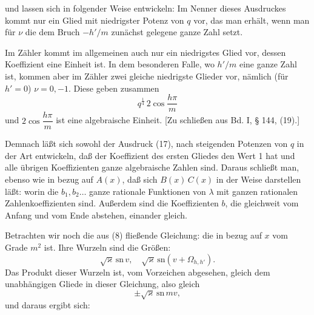 und lassen sich in folgender Weise entwickeln:
Im Nenner dieses Ausdruckes kommt nur ein Glied mit
niedrigster Potenz von $q$ vor, das man erhält, wenn man für $\nu$
die dem Bruch $-h'/m$ zunächst gelegene ganze Zahl setzt.

Im Zähler kommt im allgemeinen auch nur ein niedrigstes
Glied vor, dessen Koeffizient eine Einheit ist. In dem besonderen
Falle, wo $h'/m$ eine ganze Zahl ist, kommen aber im Zähler zwei
gleiche niedrigste Glieder vor, nämlich (für $h'=0$) $\nu=0,-1$.
Diese geben zusammen
\[
q^{\frac14}\,2\cos\frac{h\pi}{m}
\]
und $2\cos\dfrac{h\pi}{m}$ ist eine algebraische Einheit. [Zu schließen aus
Bd. I, § 144, (19).]

Demnach läßt sich sowohl der Ausdruck (17),  nach steigenden Potenzen von $q$ in der Art
entwickeln, daß der Koeffizient des ersten Gliedes den Wert 1
hat und alle übrigen Koeffizienten ganze algebraische Zahlen sind.
Daraus schließt man, ebenso wie in bezug auf $A(x)$, daß sich
$B(x)\,C(x)$ in der Weise darstellen läßt:
worin die $b_1, b_2 \ldots$ ganze rationale Funktionen von $\lambda$ mit ganzen
rationalen Zahlenkoeffizienten sind. Außerdem sind die Koeffizienten
 $b$, die gleichweit vom Anfang und vom Ende abstehen,
einander gleich.

Betrachten wir noch die aus (8) fließende Gleichung:
die in bezug auf $x$ vom Grade $m^2$ ist. Ihre Wurzeln sind die
Größen:
\[
\sqrt{\varkappa}\,\mathrm{sn}\,v, \quad \sqrt{\varkappa}\,\mathrm{sn}(v+\Omega_{h,h'}).
\]
Das Produkt dieser Wurzeln ist, vom Vorzeichen abgesehen,
gleich dem unabhängigen Gliede in dieser Gleichung, also gleich
\[
\pm \sqrt{\varkappa}\,\mathrm{sn}\,mv,
\]
und daraus ergibt sich:
